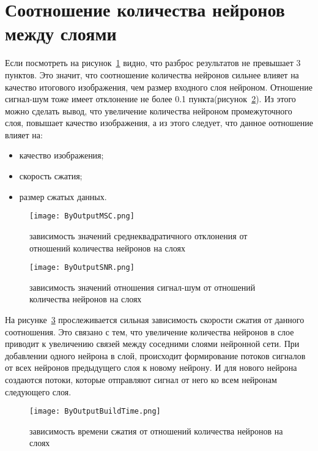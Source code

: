 \section{Соотношение количества нейронов между слоями}
\label{sub:analysis:output}

Если посмотреть на рисунок~\ref{fig:by_output_msc} видно, что разброс результатов не превышает 3 пунктов. Это значит, что соотношение количества нейронов
сильнее влияет на качество итогового изображения, чем размер входного слоя нейроном. Отношение сигнал-шум тоже имеет отклонение не более 0.1 пункта(рисунок~\ref{fig:by_output_snr}).
Из этого можно сделать вывод, что увеличение количества нейроном промежуточного слоя, повышает качество изображения, а из этого следует, что данное оотношение влияет на:
\begin{itemize}
  \item качество изображения;
  \item скорость сжатия;
  \item размер сжатых данных.
\end{itemize}

\begin{figure}[ht]
\centering
  \texttt{[image: ByOutputMSC.png]}
  \caption{ зависимость значений среднеквадратичного отклонения от отношений количества нейронов на слоях }
  \label{fig:by_output_msc}
\end{figure}

\begin{figure}[ht]
\centering
  \texttt{[image: ByOutputSNR.png]}
  \caption{ зависимость значений отношения сигнал-шум от отношений количества нейронов на слоях }
  \label{fig:by_output_snr}
\end{figure}

На рисунке~\ref{fig:by_output_build_time} прослеживается сильная зависимость скорости сжатия от данного соотношения.
Это связано с тем, что увеличение количества нейронов в слое приводит к увеличению связей между соседними слоями нейронной сети.
При добавлении одного нейрона в слой, происходит формирование потоков сигналов от всех нейронов предыдущего слоя к новому нейрону.
И для нового нейрона создаются потоки, которые отправляют сигнал от него ко всем нейронам следующего слоя.

\begin{figure}[ht]
\centering
  \texttt{[image: ByOutputBuildTime.png]}
  \caption{ зависимость времени сжатия от отношений количества нейронов на слоях }
  \label{fig:by_output_build_time}
\end{figure}

